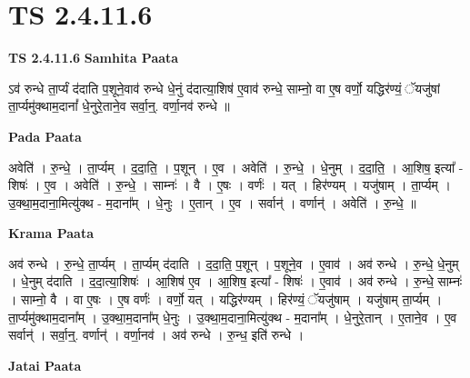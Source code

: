 \documentclass[17pt]{extarticle}
\begin{document}
\section*{ TS 2.4.11.6 }

\textbf{TS 2.4.11.6 } \newline
\textbf{Samhita Paata} \newline

ऽव॑ रुन्धे ता॒र्प्यं द॑दाति प॒शूने॒वाव॑ रुन्धे धे॒नुं द॑दात्या॒शिष॑ ए॒वाव॑ रुन्धे॒ साम्नो॒ वा ए॒ष वर्णो॒ यद्धिर॑ण्यं॒ ॅयजु॑षां ता॒र्प्यमु॑क्थाम॒दानां᳚ धे॒नुरे॒ताने॒व सर्वा॒न्॒. वर्णा॒नव॑ रुन्धे ॥ \newline

\textbf{Pada Paata} \newline

अवेति॑ । रु॒न्धे॒ । ता॒र्प्यम् । द॒दा॒ति॒ । प॒शून् । ए॒व । अवेति॑ । रु॒न्धे॒ । धे॒नुम् । द॒दा॒ति॒ । आ॒शिष॒ इत्या᳚ - शिषः॑ । ए॒व । अवेति॑ । रु॒न्धे॒ । साम्नः॑ । वै । ए॒षः । वर्णः॑ । यत् । हिर॑ण्यम् । यजु॑षाम् । ता॒र्प्यम् । उ॒क्था॒म॒दाना॒मित्यु॑क्थ - म॒दाना᳚म् । धे॒नुः । ए॒तान् । ए॒व । सर्वान्॑ । वर्णान्॑ । अवेति॑ । रु॒न्धे॒ ॥  \newline


\textbf{Krama Paata} \newline

अव॑ रुन्धे । रु॒न्धे॒ ता॒र्प्यम् । ता॒र्प्यम् द॑दाति । द॒दा॒ति॒ प॒शून् । प॒शूने॒व । ए॒वाव॑ । अव॑ रुन्धे । रु॒न्धे॒ धे॒नुम् । धे॒नुम् द॑दाति । द॒दा॒त्या॒शिषः॑ । आ॒शिष॑ ए॒व । आ॒शिष॒ इत्या᳚ - शिषः॑ । ए॒वाव॑ । अव॑ रुन्धे । रु॒न्धे॒ साम्नः॑ । साम्नो॒ वै । वा ए॒षः । ए॒ष वर्णः॑ । वर्णो॒ यत् । यद्धिर॑ण्यम् । हिर॑ण्यं॒ ॅयजु॑षाम् । यजु॑षाम् ता॒र्प्यम् । ता॒र्प्यमु॑क्थाम॒दाना᳚म् । उ॒क्था॒म॒दाना᳚म् धे॒नुः । उ॒क्था॒म॒दाना॒मित्यु॑क्थ - म॒दाना᳚म् । धे॒नुरे॒तान् । ए॒ताने॒व । ए॒व सर्वान्॑ । सर्वा॒न्॒. वर्णान्॑ । वर्णा॒नव॑ । अव॑ रुन्धे । रु॒न्ध॒ इति॑ रुन्धे । \newline

\textbf{Jatai Paata} \newline
\end{document}
